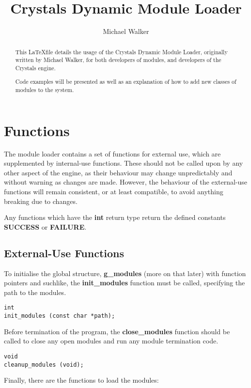 \documentclass[12pt,a4paper]{article}
\author{Michael Walker}
\title{Crystals Dynamic Module Loader}
\date{}
\begin{document}
\maketitle{}

\begin{abstract}
This \LaTeX file details the usage of the Crystals Dynamic Module Loader, originally written by Michael Walker, for both developers of modules, and developers of the Crystals engine.

Code examples will be presented as well as an explanation of how to add new classes of modules to the system.
\end{abstract}

\section{Functions}

The module loader contains a set of functions for external use, which are supplemented by internal-use functions. These should not be called upon by any other aspect of the engine, as their behaviour may change unpredictably and without warning as changes are made. However, the behaviour of the external-use functions will remain consistent, or at least compatible, to avoid anything breaking due to changes.

Any functions which have the \textbf{int} return type return the defined constants \textbf{SUCCESS} or \textbf{FAILURE}.

\subsection{External-Use Functions}

To initialise the global structure, \textbf{g\_modules} (more on that later) with function pointers and suchlike, the \textbf{init\_modules} function must be called, specifying the path to the modules.

\begin{lstlisting}
int
init_modules (const char *path);
\end{lstlisting}

Before termination of the program, the \textbf{close\_modules} function should be called to close any open modules and run any module termination code.

\begin{lstlisting}
void
cleanup_modules (void);
\end{lstlisting}

Finally, there are the functions to load the modules:
\end{document}
